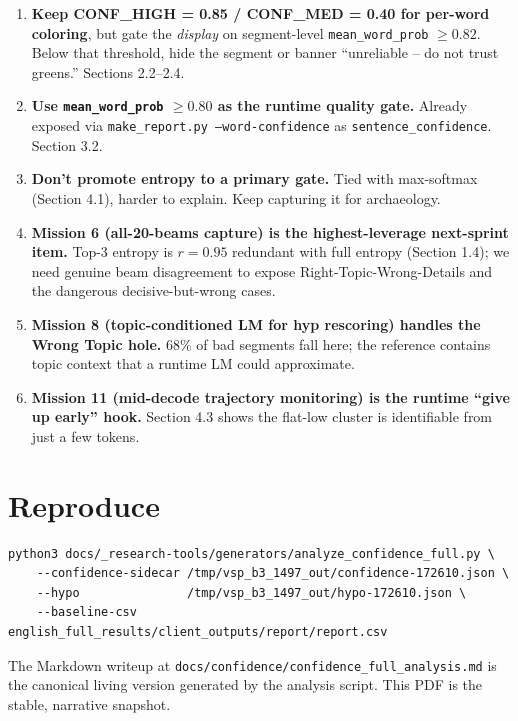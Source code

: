 \documentclass[11pt, a4paper]{article}
\begin{document}
\begin{enumerate}[leftmargin=*]
  \item \textbf{Keep CONF\_HIGH = 0.85 / CONF\_MED = 0.40 for per-word coloring}, but gate the \emph{display} on segment-level \texttt{mean\_word\_prob} $\ge 0.82$. Below that threshold, hide the segment or banner ``unreliable -- do not trust greens.'' Sections 2.2--2.4.
  \item \textbf{Use \texttt{mean\_word\_prob} $\ge 0.80$ as the runtime quality gate.} Already exposed via \texttt{make\_report.py --word-confidence} as \texttt{sentence\_confidence}. Section 3.2.
  \item \textbf{Don't promote entropy to a primary gate.} Tied with max-softmax (Section 4.1), harder to explain. Keep capturing it for archaeology.
  \item \textbf{Mission 6 (all-20-beams capture) is the highest-leverage next-sprint item.} Top-3 entropy is $r = 0.95$ redundant with full entropy (Section 1.4); we need genuine beam disagreement to expose Right-Topic-Wrong-Details and the dangerous decisive-but-wrong cases.
  \item \textbf{Mission 8 (topic-conditioned LM for hyp rescoring) handles the Wrong Topic hole.} 68\% of bad segments fall here; the reference contains topic context that a runtime LM could approximate.
  \item \textbf{Mission 11 (mid-decode trajectory monitoring) is the runtime ``give up early'' hook.} Section 4.3 shows the flat-low cluster is identifiable from just a few tokens.
\end{enumerate}

\section*{Reproduce}

\begin{verbatim}
python3 docs/_research-tools/generators/analyze_confidence_full.py \
    --confidence-sidecar /tmp/vsp_b3_1497_out/confidence-172610.json \
    --hypo               /tmp/vsp_b3_1497_out/hypo-172610.json \
    --baseline-csv       english_full_results/client_outputs/report/report.csv
\end{verbatim}

The Markdown writeup at \texttt{docs/confidence/confidence\_full\_analysis.md} is the canonical living version generated by the analysis script. This PDF is the stable, narrative snapshot.
\end{document}
